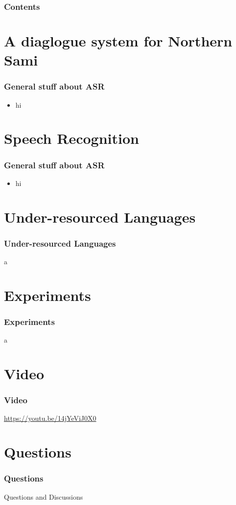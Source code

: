 \begin{frame}
\frametitle{Contents}
\tableofcontents
\end{frame}



\section{A diaglogue system for Northern Sami}
\begin{frame}
\frametitle{General stuff about ASR}
\begin{itemize}
\item hi
\end{itemize}
\end{frame}


\section{Speech Recognition}
\begin{frame}
\frametitle{General stuff about ASR}
\begin{itemize}
\item hi
\end{itemize}
\end{frame}

\section{Under-resourced Languages}
\begin{frame}
\frametitle{Under-resourced Languages}
a

\end{frame}
%

\section{Experiments}
\begin{frame}
\frametitle{Experiments}
a
\end{frame}



\section*{Video}
\begin{frame}
\frametitle{Video}
\begin{center}
\url{https://youtu.be/14jYeViJ0X0}
\end{center}
\end{frame}


\section*{Questions}

\begin{frame}
\frametitle{Questions}
\begin{center}
Questions and Discussions
\end{center}
\end{frame}


%
%


